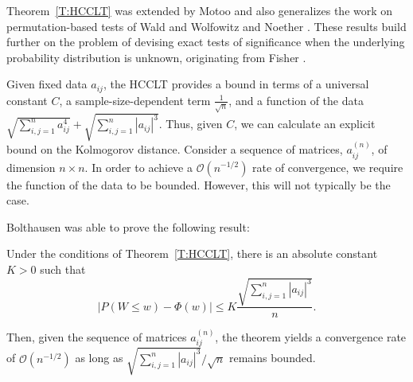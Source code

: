 Theorem~\ref{T:HCCLT} was extended by Motoo \cite{motoo1956hoeffding} and
also generalizes the work on permutation-based
tests of Wald and Wolfowitz \cite{wald1944statistical} and Noether
\cite{noether1949theorem}.  These results build further on the problem of
devising exact tests of significance when the underlying probability
distribution is unknown, originating from Fisher
\cite{fisher1935design, fisher1970statistical}.

Given fixed data $a_{ij}$, the HCCLT provides a bound in terms of a
universal constant $C$, a sample-size-dependent term
$\frac{1}{\sqrt{n}}$, and a function of the data $\sqrt{\sum_{i, j =
1}^{n} a_{ij}^4} + \sqrt{\sum_{i, j = 1}^{n} |a_{ij}|^3}$.  Thus,
given $C$, we can calculate an explicit bound on the Kolmogorov
distance.  Consider a sequence of matrices, $a_{ij}^{(n)}$, of
dimension $n \times n$.  In order to achieve a $\mathcal{O}(n^{-1/2})$
rate of convergence, we require the function of the data to be
bounded.  However, this will not typically be the case.

Bolthausen \cite{bolthausen1984estimate} was able to prove the following result:
\begin{theorem}[Bolthausen]
  Under the conditions of Theorem~\ref{T:HCCLT}, there is an absolute constant
  $K > 0$ such that
  \begin{equation*}
    |P(W \leq w) - \Phi(w)| \leq K \frac{\sqrt{\sum_{i, j = 1}^{n} |a_{ij}|^3}}{n}.
  \end{equation*}
\end{theorem}

Then, given the sequence of matrices $a_{ij}^{(n)}$, the theorem
yields a convergence rate of $\mathcal{O}(n^{-1/2})$ as long as
$\sqrt{\sum_{i, j = 1}^{n} |a_{ij}|^3} / \sqrt{n}$ remains bounded.

